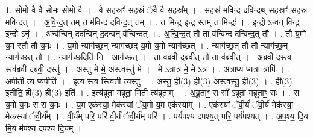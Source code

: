 \documentclass[17pt]{extarticle}
\begin{document}
1. सोमो॒ वै वै सोमः॒ सोमो॒ वै । . वै स॒हस्रꣳ॑ स॒हस्रं॒ ॅवै वै स॒हस्र᳚म् । . स॒हस्र॑ मविन्द दविन्दथ् स॒हस्रꣳ॑ स॒हस्र॑ मविन्दत् । . अ॒वि॒न्द॒त् तम् त म॑विन्द दविन्द॒त् तम् । . त मिन्द्र॒ इन्द्र॒ स्तम् त मिन्द्रः॑ । . इन्द्रो ऽन्वन् विन्द्र॒ इन्द्रो ऽनु॑ । . अन्व॑न्विन् ददन्विन् द॒दन्वन् व॑न्विन्दत् । . अ॒न्वि॒न्द॒त् तौ ता व॑न्विन्द दन्विन्द॒त् तौ । . तौ य॒मो य॒म स्तौ तौ य॒मः । . य॒मो न्याग॑च्छ॒न् न्याग॑च्छद् य॒मो य॒मो न्याग॑च्छत् । . न्याग॑च्छ॒त् तौ तौ न्याग॑च्छ॒न् न्याग॑च्छ॒त् तौ । . न्याग॑च्छ॒दिति॑ नि - आग॑च्छत् । . ता व॑ब्रवी दब्रवी॒त् तौ ता व॑ब्रवीत् । . अ॒ब्र॒वी॒ दस्त्व स्त्व॑ब्रवी दब्रवी॒ दस्तु॑ । . अस्तु॑ मे मे॒ अस्त्वस्तु॑ मे । . मे ऽत्रात्र॑ मे॒ मे ऽत्र॑ । . अत्राप्य प्यत्रा त्रापि॑ । . अपीती त्य प्यपीति॑ । . इत्य स्त्व स्त्विती त्यस्तु॑ । . अस्तु॒ ही(3) ही(3) अस्त्वस्तु॒ ही(3) । . ही(3) इतीति॒ ही(3) ही(3) इति॑ । . इत्य॑ब्रूता मब्रूता॒ मिती त्य॑ब्रूताम् । . अ॒ब्रू॒ताꣳ॒॒ स सो᳚ ऽब्रूता मब्रूताꣳ॒॒ सः । . स य॒मो य॒मः स स य॒मः । . य॒म एक॑स्या॒ मेक॑स्यां ॅय॒मो य॒म एक॑स्याम् । . एक॑स्यां ॅवी॒र्यं॑ ॅवी॒र्य॑ मेक॑स्या॒ मेक॑स्यां ॅवी॒र्य᳚म् । . वी॒र्य॑म् परि॒ परि॑ वी॒र्यं॑ ॅवी॒र्य॑म् परि॑ । . पर्य॑पश्य दपश्य॒त् परि॒ पर्य॑पश्यत् । . अ॒प॒श्य॒ दि॒य मि॒य म॑पश्य दपश्य दि॒यम् । \newline
\end{document}
